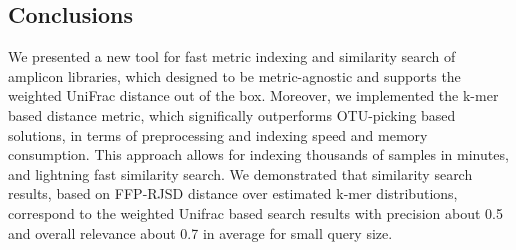 \documentclass[10pt,letterpaper]{article}
\begin{document}
\subsection*{Conclusions}
We presented a new tool for fast metric indexing and similarity search of amplicon libraries, 
which designed to be metric-agnostic and supports the weighted UniFrac distance out of the box.
Moreover, we implemented the k-mer based distance metric, which significally outperforms 
OTU-picking based solutions, in terms of preprocessing and indexing speed and memory consumption.
This approach allows for indexing thousands of samples in minutes, and lightning fast similarity search. 
We demonstrated that similarity search results, based on FFP-RJSD distance over estimated k-mer distributions, 
correspond to the weighted Unifrac based search results with precision about 0.5 and overall 
relevance about 0.7 in average for small query size.


\end{document}
